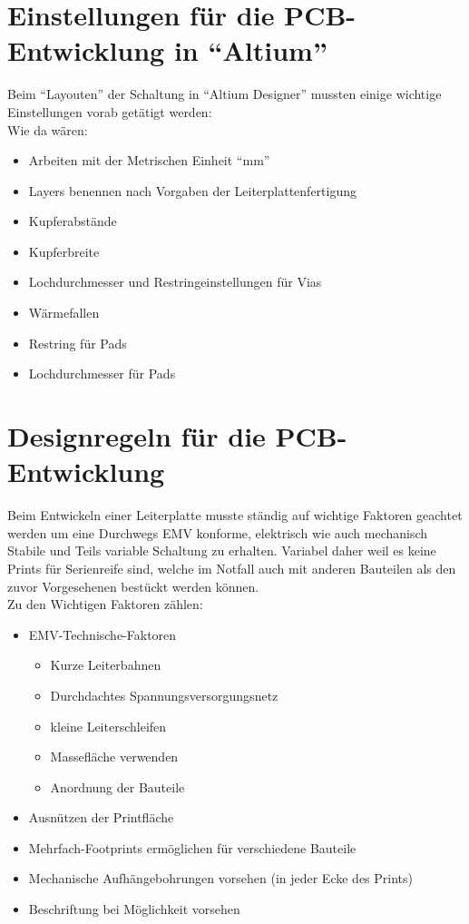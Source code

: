 \newpage
\section{Einstellungen für die PCB-Entwicklung in \enquote{Altium}}\label{subsec:8.1}
Beim \enquote{Layouten} der Schaltung in \enquote{Altium Designer} mussten einige wichtige Einstellungen vorab getätigt werden:\\
Wie da wären:
\begin{itemize}
	\item Arbeiten mit der Metrischen Einheit \enquote{mm}
	\item Layers benennen nach Vorgaben der Leiterplattenfertigung
	\item Kupferabstände
	\item Kupferbreite
	\item Lochdurchmesser und Restringeinstellungen für Vias
	\item Wärmefallen
	\item Restring für Pads
	\item Lochdurchmesser für Pads
\end{itemize}

\section{Designregeln für die PCB-Entwicklung}\label{subsec:8.2}
Beim Entwickeln einer Leiterplatte musste ständig auf wichtige Faktoren geachtet werden um eine Durchwegs EMV konforme, elektrisch wie auch mechanisch Stabile und Teils variable Schaltung zu erhalten.
Variabel daher weil es keine Prints für Serienreife sind, welche im Notfall auch mit anderen Bauteilen als den zuvor Vorgesehenen bestückt werden können.\\
Zu den Wichtigen Faktoren zählen:
\begin{itemize}
	\item EMV-Technische-Faktoren
	\begin{itemize}
		\item Kurze Leiterbahnen
		\item Durchdachtes Spannungsversorgungsnetz
		\item kleine Leiterschleifen
		\item Massefläche verwenden
		\item Anordnung der Bauteile
	\end{itemize}
	\item Ausnützen der Printfläche
	\item Mehrfach-Footprints ermöglichen für verschiedene Bauteile
	\item Mechanische Aufhängebohrungen vorsehen (in jeder Ecke des Prints)
	\item Beschriftung bei Möglichkeit vorsehen
\end{itemize}


